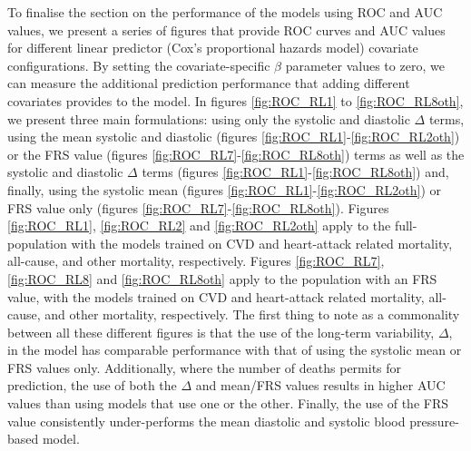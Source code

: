 \documentclass[
]{article}
\begin{document}
To finalise the section on the performance of the models using ROC and AUC values, we present a series of figures that provide ROC curves and AUC values for different linear predictor (Cox's proportional hazards model) covariate configurations. By setting the covariate-specific \(\beta\) parameter values to zero, we can measure the additional prediction performance that adding different covariates provides to the model. In figures \ref{fig:ROC_RL1} to \ref{fig:ROC_RL8oth}, we present three main formulations: using only the systolic and diastolic \(\Delta\) terms, using the mean systolic and diastolic (figures \ref{fig:ROC_RL1}-\ref{fig:ROC_RL2oth}) or the FRS value (figures \ref{fig:ROC_RL7}-\ref{fig:ROC_RL8oth}) terms as well as the systolic and diastolic \(\Delta\) terms (figures \ref{fig:ROC_RL1}-\ref{fig:ROC_RL8oth}) and, finally, using the systolic mean (figures \ref{fig:ROC_RL1}-\ref{fig:ROC_RL2oth}) or FRS value only (figures \ref{fig:ROC_RL7}-\ref{fig:ROC_RL8oth}). Figures \ref{fig:ROC_RL1}, \ref{fig:ROC_RL2} and \ref{fig:ROC_RL2oth} apply to the full-population with the models trained on CVD and heart-attack related mortality, all-cause, and other mortality, respectively. Figures \ref{fig:ROC_RL7}, \ref{fig:ROC_RL8} and \ref{fig:ROC_RL8oth} apply to the population with an FRS value, with the models trained on CVD and heart-attack related mortality, all-cause, and other mortality, respectively. The first thing to note as a commonality between all these different figures is that the use of the long-term variability, \(\Delta\), in the model has comparable performance with that of using the systolic mean or FRS values only. Additionally, where the number of deaths permits for prediction, the use of both the \(\Delta\) and mean/FRS values results in higher AUC values than using models that use one or the other. Finally, the use of the FRS value consistently under-performs the mean diastolic and systolic blood pressure-based model.
\end{document}
